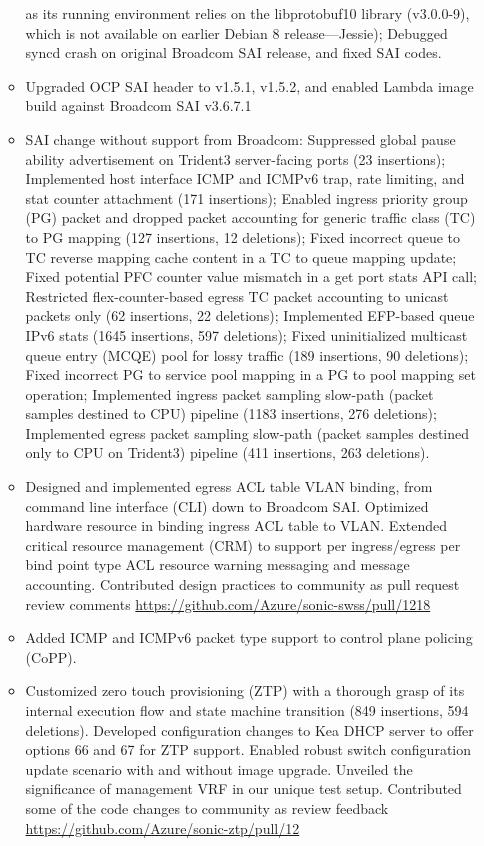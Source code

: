 \documentclass[letterpaper,11pt]{article}
\newcommand{\resitem}[1]{\item #1 \vspace{-2pt}}
\begin{document}
\begin{itemize}
\begin{itemize}
{  as its running environment relies on the libprotobuf10 library (v3.0.0-9), which is not available on earlier Debian 8 release---Jessie);
  Debugged syncd crash on original Broadcom SAI release, and fixed SAI codes.}
  \resitem{Upgraded OCP SAI header to v1.5.1, v1.5.2, and enabled Lambda image build against Broadcom SAI v3.6.7.1}
  \resitem{SAI change without support from Broadcom: Suppressed global pause ability advertisement on Trident3 server-facing ports (23 insertions);
  Implemented host interface ICMP and ICMPv6 trap, rate limiting, and stat counter attachment (171 insertions);
  Enabled ingress priority group (PG) packet and dropped packet accounting for generic traffic class (TC) to PG mapping (127 insertions, 12 deletions);
  Fixed incorrect queue to TC reverse mapping cache content in a TC to queue mapping update;
  Fixed potential PFC counter value mismatch in a get port stats API call;
  Restricted flex-counter-based egress TC packet accounting to unicast packets only (62 insertions, 22 deletions);
  Implemented EFP-based queue IPv6 stats (1645 insertions, 597 deletions);
  Fixed uninitialized multicast queue entry (MCQE) pool for lossy traffic (189 insertions, 90 deletions);
  Fixed incorrect PG to service pool mapping in a PG to pool mapping set operation;
  Implemented ingress packet sampling slow-path (packet samples destined to CPU) pipeline (1183 insertions, 276 deletions);
  Implemented egress packet sampling slow-path (packet samples destined only to CPU on Trident3) pipeline (411 insertions, 263 deletions).}
  \resitem{Designed and implemented egress ACL table VLAN binding, from command line interface (CLI) down to Broadcom SAI.
  Optimized hardware resource in binding ingress ACL table to VLAN.
  Extended critical resource management (CRM) to support per ingress/egress per bind point type ACL resource warning messaging and message accounting.
  Contributed design practices to community as pull request review comments \url{https://github.com/Azure/sonic-swss/pull/1218}}
  \resitem{Added ICMP and ICMPv6 packet type support to control plane policing (CoPP).}
  \resitem{Customized zero touch provisioning (ZTP) with a thorough grasp of its internal execution flow and state machine
  transition (849 insertions, 594 deletions).
  Developed configuration changes to Kea DHCP server to offer options 66 and 67 for ZTP support.
  Enabled robust switch configuration update scenario with and without image upgrade.
  Unveiled the significance of management VRF in our unique test setup.
  Contributed some of the code changes to community as review feedback \url{https://github.com/Azure/sonic-ztp/pull/12}}

\end{itemize}
\end{itemize}
\end{document}
